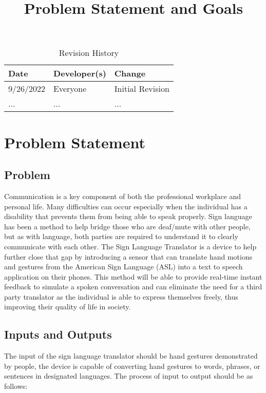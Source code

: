 \documentclass{article}
\title{Problem Statement and Goals\\\progname}
\author{\authname}
\date{}
\begin{document}
\maketitle

\begin{table}[hp]
\caption{Revision History} \label{TblRevisionHistory}
\begin{tabularx}{\textwidth}{llX}
\toprule
\textbf{Date} & \textbf{Developer(s)} & \textbf{Change}\\
\midrule
9/26/2022 & Everyone & Initial Revision\\
... & ... & ...\\
\bottomrule
\end{tabularx}
\end{table}

\section{Problem Statement}

\subsection{Problem}
Communication is a key component of both the professional workplace and personal life. Many difficulties
can occur especially when the individual has a disability that prevents them from being able to speak properly.
Sign language has been a method to help bridge those who are deaf/mute with other people, but as with language,
both parties are required to understand it to clearly communicate with each other. The Sign Language Translator
is a device to help further close that gap by introducing a sensor that can translate hand motions and gestures
from the American Sign Language (ASL) into a text to speech application on their phones. This method will be able
to provide real-time instant feedback to simulate a spoken conversation and can eliminate the need for a third party
translator as the individual is able to express themselves freely, thus improving their quality of life in society. 

\subsection{Inputs and Outputs}

The input of the sign language translator should be hand gestures demonstrated by people, the device is capable of 
converting hand gestures to words, phrases, or sentences in designated languages. The process of input to output 
should be as follows:
\end{document}
